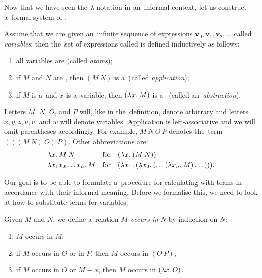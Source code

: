 Now that we have seen the~λ-notation in an~informal context, let us
construct a~formal system of \lc.
\begin{definition}\label{def:lambda_calculus}
  Assume that we are given an~infinite sequence of expressions $\mathbf{v}_0,
  \mathbf{v}_1, \mathbf{v}_2, \dots$ called \emph{variables}; then the~set of
  expressions called \emph{\lts} is defined inductively as follows:
  \begin{enumerate}
    \item all variables are \lts (called \emph{atoms});
    \item if $M$ and $N$ are \lts, then $(M \: N)$ is a~\lt (called
      \emph{application});
    \item if $M$ is a~\lt and $x$ is a~variable, then $(\lambda x . \: M)$ is a~\lt
      (called an~\emph{abstraction}).
  \end{enumerate}
\end{definition}
Letters $M$, $N$, $O$, and $P$ will, like in the~definition, denote arbitrary
\lts and letters $x, y, z, u, v$, and $w$ will denote variables. Application is
left-associative and we will omit parentheses accordingly. For example,
$M \: N \: O \: P$ denotes the~term $(((M \: N) \: O) \: P)$. Other
abbreviations are:
\begin{align*}
  &{\lambda x . \: M \: N}  &  &\text{for}  &  &(\lambda x . \: (M \: N)) \\
  &{\lambda x_1 x_2 \dots x_n . \: M}  &  &\text{for}  &
    &(\lambda x_1 . \: (\lambda x_2 . \: ( \dots (\lambda x_n . \: M) \dots ))).
\end{align*}


Our goal is to be able to formulate a~procedure for calculating with terms in
accordance with their informal meaning. Before we formalise this, we need to
look at how to substitute terms for variables.

\begin{definition}
  Given \lts $M$ and $N$, we define a~relation \emph{$M$ occurs in $N$} by
  induction on $N$:
  \begin{enumerate}
    \item $M$ occurs in $M$;
    \item if $M$ occurs in $O$ or in $P$, then $M$ occurs in $(O \: P)$;
    \item if $M$ occurs in $O$ or $M \equiv x$, then $M$ occurs in $(\lambda x . \: O)$.
  \end{enumerate}
\end{definition}

